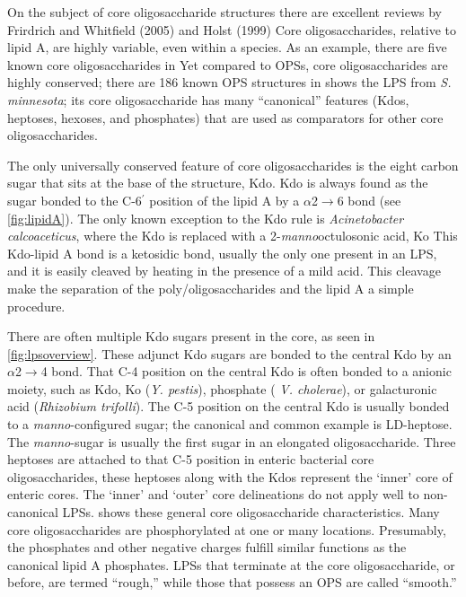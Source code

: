     On the subject of core oligosaccharide structures there are excellent reviews by Frirdrich and Whitfield (2005) and Holst
(1999) Core oligosaccharides, relative to lipid A, are highly variable, even within a species. As an example, there are five known core
oligosaccharides in \ecoli{} Yet compared to \acp{OPS}, core oligosaccharides are highly conserved; there are 186 known \ac{OPS} structures in
\ecoli{}  shows the \ac{LPS} from \textit{S. minnesota}; its core oligosaccharide has many ``canonical'' features (\eg Kdos, heptoses,
hexoses, and phosphates) that are used as comparators for other core oligosaccharides.

 The only universally conserved feature of core oligosaccharides is the eight carbon sugar that sits at the base of the structure,
Kdo. Kdo is always found as the sugar bonded to the C-6$^\prime$ position of the
lipid A by a $\alpha$2$\rightarrow$6 bond (see \cref{fig:lipidA}). The only
known exception to the Kdo
rule is \textit{Acinetobacter calcoaceticus}, where the Kdo is replaced with a 2-\textit{manno}octulosonic acid, Ko This Kdo-lipid A bond is a
ketosidic bond, usually the only one present in an \ac{LPS}, and it is easily cleaved by heating in the presence of a mild acid. This cleavage make the separation of the
poly/oligosaccharides and the lipid A a simple procedure.

There are often multiple Kdo sugars present in the core, as seen in \cref{fig:lpsoverview}. These adjunct Kdo sugars are bonded to the central Kdo by an $\alpha$2$\rightarrow$4
bond. That C-4 position on the central Kdo is often bonded to a anionic moiety, such as Kdo, Ko (\textit{Y. pestis}), phosphate ( \textit{V.
cholerae}), or galacturonic acid (\textit{Rhizobium trifolli}). The C-5 position on the central Kdo is usually bonded to a
\textit{manno}-configured sugar; the canonical and common example is LD-heptose. The \textit{manno}-sugar is usually the first sugar in an elongated oligosaccharide. Three heptoses
are attached to that C-5 position in enteric bacterial core oligosaccharides, these heptoses along with the Kdos represent the `inner' core of enteric cores. The `inner' and
`outer' core delineations do not apply well to non-canonical \acp{LPS}.  shows these general core oligosaccharide characteristics. Many core oligosaccharides
are phosphorylated at one or many locations. Presumably, the phosphates and other negative charges fulfill similar functions as the canonical lipid A phosphates. \Acp{LPS} that
terminate at the core oligosaccharide, or before, are termed ``rough,'' while those that possess an \ac{OPS} are called ``smooth.''

